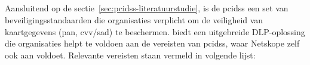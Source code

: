 \subsection{}
\label{sec:pci_dss}


Aansluitend op de sectie~\ref{sec:pcidss-literatuurstudie}, is de \gls{pcidss} een set van beveiligingsstandaarden die organisaties verplicht om de veiligheid van kaartgegevens (\gls{pan}, \gls{cvv}/\gls{sad}) te beschermen.
\textcite{Netskope2024PCIDSS} biedt een uitgebreide DLP-oplossing die organisaties helpt te voldoen aan de vereisten van \gls{pcidss}, waar Netskope zelf ook aan voldoet.
Relevante vereisten staan vermeld in volgende lijst:

